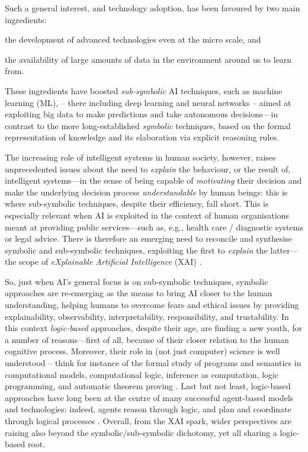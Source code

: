 \documentclass[12pt,a4paper,openright,twoside]{book}
\begin{document}
Such a general interest, and technology adoption, has been favoured by two main ingredients:
%
\begin{inlinelist}
    \item the development of advanced technologies even at the micro scale, and
    \item the availability of large amounts of data in the environment around us to learn from.
\end{inlinelist}
%
These ingredients have boosted \emph{sub-symbolic} AI techniques, such as machine learning (ML), -- there including deep learning and neural networks -- aimed at exploiting big data to make predictions and take autonomous decisions---in contrast to the more long-established \emph{symbolic} techniques, based on the formal representation of knowledge and its elaboration via explicit reasoning rules.

The increasing role of intelligent systems in human society, however, raises unprecedented issues about the need to \emph{explain} the behaviour, or the result of, intelligent systems---in the sense of being capable of \emph{motivating} their decision and make the underlying decision process \emph{understandable} by human beings: this is where sub-symbolic techniques, despite their efficiency, fall short.
%
This is especially relevant when AI is exploited in the context of human organisations meant at providing public services---such as, e.g., health care / diagnostic systems or legal advice.
%
There is therefore an emerging need to reconcile and synthesise symbolic and sub-symbolic techniques, exploiting the first to \emph{explain} the latter---the scope of \emph{eXplainable Artificial Intelligence} (XAI) \cite{darpa2016-xai}.

So, just when AI's general focus is on sub-symbolic techniques, symbolic approaches are re-emerging as the means to bring AI closer to the human understanding, helping humans to overcome fears and ethical issues by providing explainability, observability, interpretability, responsibility, and trustability.
%
In this context \emph{logic-based} approaches, despite their age, are finding a new youth, for a number of reasons---first of all, because of their closer relation to the human cognitive process.
%
Moreover, their role in (not just computer) science is well understood -- think for instance of the formal study of programs and semantics in computational models, computational logic, inference as computation, logic programming, and automatic theorem proving \cite{gallier2015,boyer2014-computationallogic}.
%
Last but not least, logic-based approaches have long been at the centre of many successful agent-based models and technologies: indeed, agents reason through logic, and plan and coordinate through logical processes \cite{levesque1984,omicini1995,bordini2006}.
%
Overall, from the XAI spark, wider perspectives are raising also beyond the symbolic/sub-symbolic dichotomy, yet all sharing a logic-based root.
\end{document}
